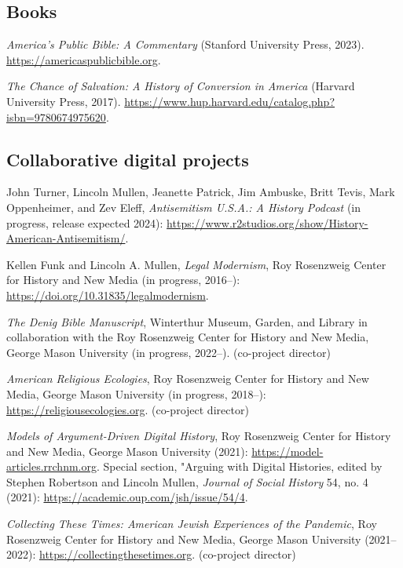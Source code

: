 \documentclass[11pt]{article}
\begin{document}

\subsection{Books}\label{Books}

\emph{America's Public Bible: A Commentary} (Stanford University Press, 2023). \url{https://americaspublicbible.org}.

\emph{The Chance of Salvation: A History of Conversion in America} (Harvard University Press, 2017). \url{https://www.hup.harvard.edu/catalog.php?isbn=9780674975620}.

\subsection{Collaborative digital projects}\label{Digital projects}

John Turner, Lincoln Mullen, Jeanette Patrick, Jim Ambuske, Britt Tevis, Mark Oppenheimer, and Zev Eleff, \emph{Antisemitism U.S.A.: A History Podcast} (in progress, release expected 2024): \url{https://www.r2studios.org/show/History-American-Antisemitism/}.

Kellen Funk and Lincoln A. Mullen, \emph{Legal Modernism}, Roy Rosenzweig Center for History and New Media (in progress, 2016--): \url{https://doi.org/10.31835/legalmodernism}.

\emph{The Denig Bible Manuscript}, Winterthur Museum, Garden, and Library in collaboration with the Roy Rosenzweig Center for History and New Media, George Mason University (in progress, 2022--). (co-project director)

\emph{American Religious Ecologies}, Roy Rosenzweig Center for History and New Media, George Mason University (in progress, 2018--): \url{https://religiousecologies.org}. (co-project director)

\emph{Models of Argument-Driven Digital History}, Roy Rosenzweig Center for History and New Media, George Mason University (2021): \url{https://model-articles.rrchnm.org}. Special section, "Arguing with Digital Histories, edited by Stephen Robertson and Lincoln Mullen, \emph{Journal of Social History} 54, no. 4 (2021): \url{https://academic.oup.com/jsh/issue/54/4}. 

\emph{Collecting These Times: American Jewish Experiences of the Pandemic}, Roy Rosenzweig Center for History and New Media, George Mason University (2021--2022): \url{https://collectingthesetimes.org}. (co-project director)
\end{document}
